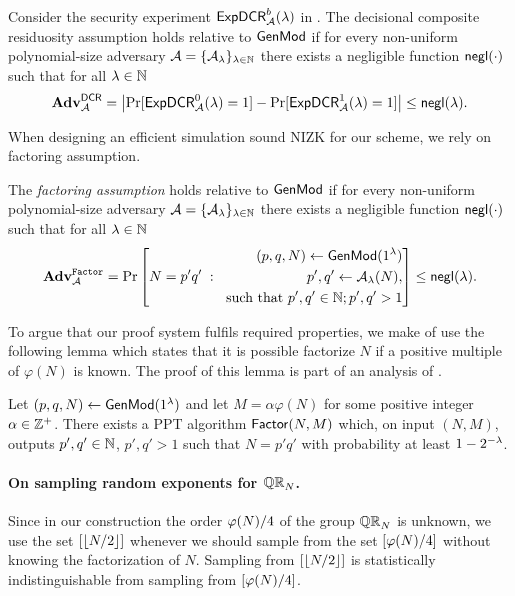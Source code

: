 \begin{definition}
Consider the security experiment $\mathsf{ExpDCR}_{\mathcal{A}}^{b}(\lambda)$ in .
The decisional composite residuosity assumption holds relative to $\mathsf{GenMod}$ if for every non-uniform polynomial-size adversary $\mathcal{A} = \{\mathcal{A}_{\lambda}\}_{\lambda \in \mathbb{N}}$ there exists a negligible function $\mathsf{negl}(\cdot)$ such that for all $\lambda \in \mathbb{N}$ 
\[\mathbf{Adv}^\mathsf{DCR}_{\mathcal{A}} = \left| \Pr[\mathsf{ExpDCR}_{\mathcal{A}}^{0}(\lambda) = 1] - \Pr[\mathsf{ExpDCR}_{\mathcal{A}}^{1}(\lambda) = 1] \right| \leq \mathsf{negl}(\lambda).\]
\end{definition} 


When designing an efficient simulation sound NIZK for our scheme, we rely on factoring assumption. 

\begin{definition}
The \emph{factoring assumption} holds relative to $\mathsf{GenMod}$ if  for every non-uniform polynomial-size adversary $\mathcal{A} = \{\mathcal{A}_{\lambda}\}_{\lambda \in \mathbb{N}}$ there exists a negligible function $\mathsf{negl}(\cdot)$ such that for all $\lambda \in \mathbb{N}$ 
\[ \mathbf{Adv}_{\mathcal{A}}^{\mathtt{Factor}} = 
\Pr\left[ 
		N = p'q'
		\;:\;
    \begin{aligned}
    	(p, q, N) \leftarrow \mathsf{GenMod}(1{^{\lambda}}) \\
			p',q' \leftarrow \mathcal{A}_{\lambda}(N), \\
			\text{ such that }  p', q' \in \mathbb{N}; p', q'>1
    \end{aligned}
    \right] 
\leq \mathsf{negl}(\lambda). 
\]
\end{definition}

To argue that our proof system fulfils required properties, we make of use the following lemma which states that it is possible factorize $N$ if a positive multiple of $\varphi(N)$ is known. The proof of this lemma is part of an analysis of \cite[Theorem 8.50]{books/crc/KatzLindell2014}.
\begin{lemma}\label{factor-lemma}
Let $(p,q,N)  \leftarrow \mathsf{GenMod}(1{^{\lambda}})$ and let $M = \alpha\varphi(N)$ for some positive integer $\alpha\in \mathbb{Z}^+$. There exists a PPT algorithm $\mathsf{Factor}(N, M)$ which, on input $(N,M)$, outputs $p',q' \in \mathbb{N}$, $p', q'>1$ such that $N = p'q'$ with probability at least $1-2^{-\lambda}$. 
\end{lemma}


\paragraph{On sampling random exponents for $\mathbb{QR}_N$.}
Since in our construction the order $\varphi(N)/4$ of the group $\mathbb{QR}_N$ is unknown, we use the set $[\left\lfloor N/2 \right\rfloor]$ whenever we should sample from the set $[\varphi(N)/4]$ without knowing the factorization of $N$. Sampling from $[\left\lfloor N/2 \right\rfloor]$ is statistically indistinguishable from sampling from $[\varphi(N)/4]$. 

